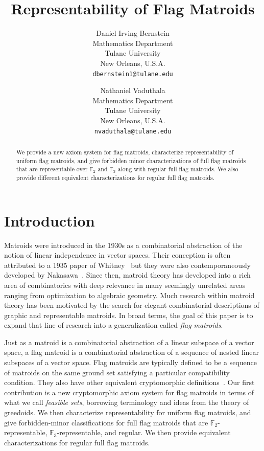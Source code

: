 \documentclass[12pt]{article}
\title{\textbf{Representability of Flag Matroids}}
\author{
Daniel Irving Bernstein \\
\normalsize{Mathematics Department} \\
\normalsize{Tulane University}\\
\normalsize{New Orleans, U.S.A.}\\
\normalsize{\texttt{dbernstein1@tulane.edu}}
\and
Nathaniel Vaduthala \\
\normalsize{Mathematics Department} \\
\normalsize{Tulane University}\\
\normalsize{New Orleans, U.S.A.}\\
\normalsize{\texttt{nvaduthala@tulane.edu}}
}
\date{}
\theoremstyle{definition}
\begin{document}
\maketitle

\begin{abstract}
    We provide a new axiom system for flag matroids, characterize representability of uniform flag matroids, and give forbidden minor characterizations of full flag matroids that are representable over $\mathbb{F}_2$ and $\mathbb{F}_3$ along with regular full flag matroids. We also provide different equivalent characterizations for regular full flag matroids. 
\end{abstract}

\section{Introduction}
Matroids were introduced in the 1930s as a combinatorial abstraction of the notion of linear independence in vector spaces.
Their conception is often attributed to a 1935 paper of Whitney~\cite{whitney1935abstract}
but they were also contemporaneously developed by Nakasawa~\cite{nishimura2009lost}.
Since then, matroid theory has developed into a rich area of combinatorics
with deep relevance in many seemingly unrelated areas ranging from optimization to algebraic geometry.
Much research within matroid theory has been motivated by the search for elegant combinatorial descriptions of graphic and representable matroids.
In broad terms, the goal of this paper is to expand that line of research into a generalization called \emph{flag matroids}.

Just as a matroid is a combinatorial abstraction of a linear subspace of a vector space, a flag matroid is a combinatorial abstraction of a sequence of nested linear subspaces of a vector space.
Flag matroids are typically defined to be a sequence of matroids on the same ground set
satisfying a particular compatibility condition.
They also have other equivalent cryptomorphic definitions~\cite{borovik2003coxeter}.
Our first contribution is a new cryptomorphic axiom system for flag matroids in terms of what we call \emph{feasible sets}, borrowing terminology and ideas from the theory of greedoids.
We then characterize representability for uniform flag matroids,
and give forbidden-minor classifications for full flag matroids that are
$\mathbb{F}_2$-representable, $\mathbb{F}_3$-representable, and regular. We then provide equivalent characterizations for regular full flag matroids.
\end{document}
